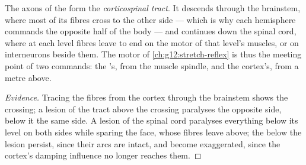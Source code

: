 \begin{proposition}\label{prop:g12:brain-and-movement:pathway}
The axons of the   form the \emph{corticospinal
tract}. It descends through the brainstem,
where most of its fibres cross to the other side --- which is why each
hemisphere commands the opposite half of the body --- and continues
down the spinal cord, where at each level fibres leave to end on the
motor  of that level's muscles, or on interneurons beside them.
The motor  of \cref{ch:g12:stretch-reflex} is thus the meeting
point of two commands: the 's, from the muscle spindle, and
the cortex's, from a metre above.
\end{proposition}
\begin{proof}[Evidence]
Tracing the fibres from the cortex through the brainstem shows the
crossing; a lesion of the tract above the crossing paralyses the
opposite side, below it the same side. A lesion of the spinal cord
paralyses everything below its level on both sides while sparing the
face, whose fibres leave above; the  below the lesion persist,
since their arcs are intact, and become exaggerated, since the
cortex's damping influence no longer reaches them.
\end{proof}


